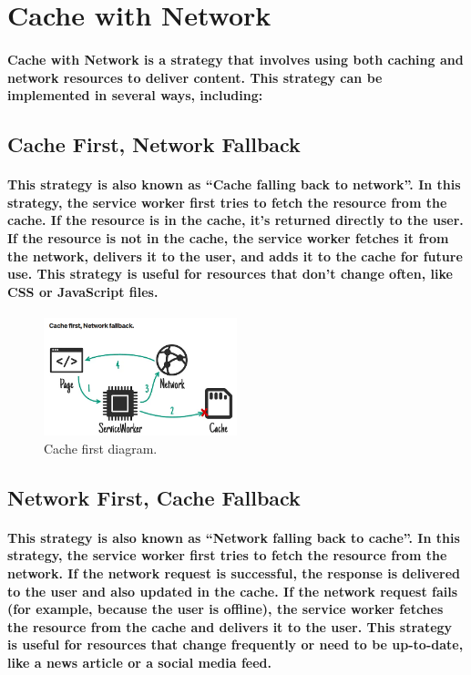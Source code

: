 \documentclass[12pt,a4paper]{article}
\begin{document}
    \section{Cache with Network}

    \paragraph{Cache with Network is a strategy that involves using both caching and network resources to deliver content. This strategy can be implemented in several ways, including:}

    \subsection{Cache First, Network Fallback}

    \paragraph{This strategy is also known as “Cache falling back to network”. In this strategy, the service worker first tries to fetch the resource from the cache. If the resource is in the cache, it’s returned directly to the user. If the resource is not in the cache, the service worker fetches it from the network, delivers it to the user, and adds it to the cache for future use. This strategy is useful for resources that don’t change often, like CSS or JavaScript files.}

    \begin{figure}[h!]
      \centering
      \includegraphics[width=0.5\textwidth]{cachefirst.png}
      \caption{Cache first diagram.}
    \end{figure}
    
    \subsection{Network First, Cache Fallback}

    \paragraph{This strategy is also known as “Network falling back to cache”. In this strategy, the service worker first tries to fetch the resource from the network. If the network request is successful, the response is delivered to the user and also updated in the cache. If the network request fails (for example, because the user is offline), the service worker fetches the resource from the cache and delivers it to the user. This strategy is useful for resources that change frequently or need to be up-to-date, like a news article or a social media feed.}
\end{document}
